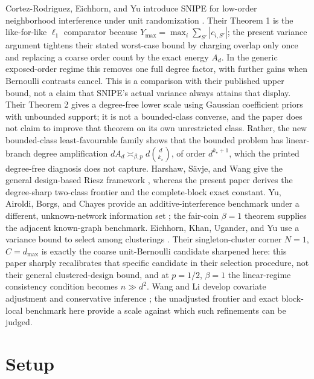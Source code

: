 \documentclass{article}
\begin{document}
Cortez-Rodriguez, Eichhorn, and Yu introduce SNIPE for low-order neighborhood interference under unit randomization \cite{CortezRodriguezEichhornYu2023}. Their Theorem 1 is the like-for-like \(\ell_1\) comparator because \(Y_{\max}=\max_i\sum_{S'}|c_{i,S'}|\); the present variance argument tightens their stated worst-case bound by charging overlap only once and replacing a coarse order count by the exact energy \(A_d\). In the generic exposed-order regime this removes one full degree factor, with further gains when Bernoulli contrasts cancel. This is a comparison with their published upper bound, not a claim that SNIPE's actual variance always attains that display. Their Theorem 2 gives a degree-free lower scale using Gaussian coefficient priors with unbounded support; it is not a bounded-class converse, and the paper does not claim to improve that theorem on its own unrestricted class. Rather, the new bounded-class least-favourable family shows that the bounded problem has linear-branch degree amplification \(dA_d\asymp_{\beta,p}d\binom d{k_\star}\), of order \(d^{k_\star+1}\), which the printed degree-free diagnosis does not capture. Harshaw, Sävje, and Wang give the general design-based Riesz framework \cite{HarshawSavjeWang2025}, whereas the present paper derives the degree-sharp two-class frontier and the complete-block exact constant. Yu, Airoldi, Borgs, and Chayes provide an additive-interference benchmark under a different, unknown-network information set \cite{YuAiroldiBorgsChayes2022}; the fair-coin \(\beta=1\) theorem supplies the adjacent known-graph benchmark. Eichhorn, Khan, Ugander, and Yu use a variance bound to select among clusterings \cite{EichhornKhanUganderYu2026}. Their singleton-cluster corner \(N=1\), \(C=d_{\max}\) is exactly the coarse unit-Bernoulli candidate sharpened here: this paper sharply recalibrates that specific candidate in their selection procedure, not their general clustered-design bound, and at \(p=1/2\), \(\beta=1\) the linear-regime consistency condition becomes \(n\gg d^2\). Wang and Li develop covariate adjustment and conservative inference \cite{WangLi2026}; the unadjusted frontier and exact block-local benchmark here provide a scale against which such refinements can be judged.

\section{Setup}
\end{document}

